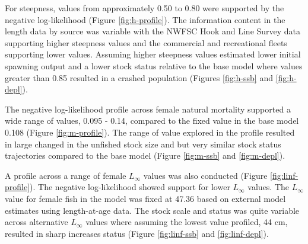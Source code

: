 \documentclass[11pt,
  english,
  a4paper,
]{article}
\begin{document}
\leavevmode\tagmcend\tagstructend\par


For steepness, values from approximately 0.50 to 0.80 were supported by the negative log-likelihood (Figure \ref{fig:h-profile}). The information content in the length data by source was variable with the NWFSC Hook and Line Survey data supporting higher steepness values and the commercial and recreational fleets supporting lower values. Assuming higher steepness values estimated lower initial spawning output and a lower stock status relative to the base model where values greater than 0.85 resulted in a crashed population (Figures \ref{fig:h-ssb} and \ref{fig:h-depl}).

\leavevmode\tagmcend\tagstructend\par


The negative log-likelihood profile across female natural mortality supported a wide range of values, 0.095 - 0.14, compared to the fixed value in the base model 0.108 (Figure \ref{fig:m-profile}). The range of value explored in the profile resulted in large changed in the unfished stock size and but very similar stock status trajectories compared to the base model (Figure \ref{fig:m-ssb} and \ref{fig:m-depl}).

\leavevmode\tagmcend\tagstructend\par


A profile across a range of female {\(L_{\infty}\)\leavevmode\tagmcend\tagstructend} values was also conducted (Figure \ref{fig:linf-profile}). The negative log-likelihood showed support for lower {\(L_{\infty}\)\leavevmode\tagmcend\tagstructend} values. The {\(L_{\infty}\)\leavevmode\tagmcend\tagstructend} value for female fish in the model was fixed at 47.36 based on external model estimates using length-at-age data. The stock scale and status was quite variable across alternative {\(L_{\infty}\)\leavevmode\tagmcend\tagstructend} values where assuming the lowest value profiled, 44 cm, resulted in sharp increases status (Figure \ref{fig:linf-ssb} and \ref{fig:linf-depl}).
\end{document}
